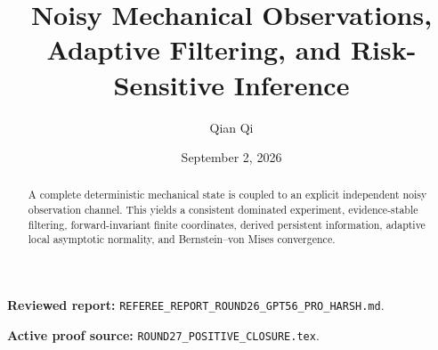 \documentclass[11pt,reqno]{amsart}
\title[C1 Round 27 revision]{Noisy Mechanical Observations, Adaptive Filtering, and Risk-Sensitive Inference}
\author{Qian Qi}
\date{September 2, 2026}
\begin{document}
\begin{abstract}A complete deterministic mechanical state is coupled to an explicit independent noisy observation channel. This yields a consistent dominated experiment, evidence-stable filtering, forward-invariant finite coordinates, derived persistent information, adaptive local asymptotic normality, and Bernstein--von Mises convergence.\end{abstract}
\maketitle
\noindent\textbf{Reviewed report:} \texttt{REFEREE\_REPORT\_ROUND26\_GPT56\_PRO\_HARSH.md}.\par
\noindent\textbf{Active proof source:} \texttt{ROUND27\_POSITIVE\_CLOSURE.tex}.\par

\end{document}
